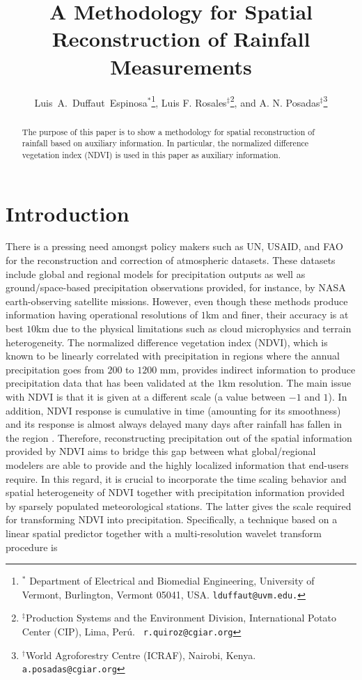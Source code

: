 \documentclass[10pt,letterpaper,conference]{ieeeconf}
\title{A Methodology for Spatial Reconstruction of Rainfall Measurements}
\author{Luis~A.~Duffaut~Espinosa$^\ast$\thanks{$^\ast$ Department of 
Electrical and Biomedial Engineering, University of Vermont, 
Burlington, Vermont 05041, USA. {\tt lduffaut@uvm.edu.}},  Luis F. 
Rosales$^\ddagger$\thanks{$^\ddagger$Production Systems and the Environment 
Division, International Potato Center (CIP), Lima, Per\'u. {\tt 
r.quiroz@cgiar.org}}, and A. N. 
Posadas$^{\ddagger}$\thanks{$^\dagger$World Agroforestry Centre 
(ICRAF), Nairobi, Kenya. {\tt a.posadas@cgiar.org}}}
\begin{document}
\maketitle

\begin{abstract}
 The purpose of this paper is to show a methodology for spatial 
reconstruction of rainfall based on auxiliary information. In particular, 
the normalized difference vegetation index (NDVI) is used in this paper as 
auxiliary  information. 
\end{abstract}


\section{Introduction}

There is a pressing need amongst policy makers such as UN, USAID, and FAO for 
the reconstruction and correction of atmospheric datasets. These datasets 
include global and regional models for precipitation outputs as well as 
ground/space-based precipitation observations provided, for instance, 
by NASA earth-observing satellite missions. However, 
even though these methods produce information having operational 
resolutions of $1$km and finer, their accuracy is at best 
$10$km due to the physical limitations such as cloud microphysics and terrain 
heterogeneity. The normalized difference vegetation index 
(NDVI), which is known to be linearly correlated with precipitation in regions 
where the annual precipitation goes from $200$ to $1200$ mm, provides 
indirect information to produce precipitation data that has been validated at 
the $1$km resolution. The main issue with NDVI is that it is given at a 
different scale (a value between $-1$ and $1$). In addition, NDVI response is 
cumulative in time (amounting for its smoothness) and its response is almost 
always delayed many days after rainfall has fallen in the region 
\cite{Immerzeel-et-al_2005,Duffaut-et-al_2017}. Therefore, reconstructing 
precipitation out of the spatial information provided by NDVI aims to bridge 
this gap between what global/regional modelers are able to provide and the 
highly localized information that end-users require. In this regard, it is 
crucial to incorporate the time scaling behavior and spatial heterogeneity of 
NDVI together with precipitation information provided by sparsely populated 
meteorological stations. The latter gives the scale required for transforming 
NDVI into precipitation. Specifically, a technique based on a linear spatial 
predictor together with a multi-resolution wavelet transform procedure is 
\end{document}
